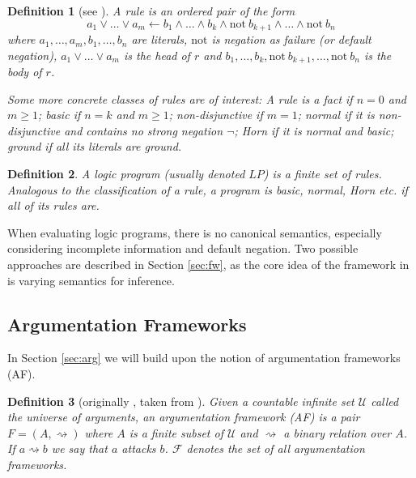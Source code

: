 \documentclass[a4paper]{article}
\newcommand{\fail}{\mathrm{not } \ \xspace}
\newcommand{\from}{\ensuremath{\leftarrow}}
\newcommand{\universe}{\mathcal{U}}
\newcommand{\afs}{\mathcal{F}}
\newcommand{\attacks}{\rightsquigarrow}
\newtheorem{definition}{Definition}
\begin{document}
\begin{definition}[{see \cite[Slide 15]{ewbs}}]
	A \emph{rule} is an ordered pair of the form $$a_1 \vee \ldots \vee a_m \from b_1 \wedge \ldots \wedge b_k \wedge \fail b_{k+1} \wedge \ldots \wedge \fail b_n$$ where $a_1, \ldots, a_m, b_1, \ldots, b_n$ are literals, $\mathrm{not}$ is \emph{negation as failure} (or \emph{default negation}), $a_1 \vee \ldots \vee a_m$ is the \emph{head} of $r$ and $b_1, \ldots, b_k, \fail b_{k+1}, \ldots, \fail b_n$ is the \emph{body} of $r$.
	
	Some more concrete classes of rules are of interest: A rule is a \emph{fact} if $n = 0$ and $m \geq 1$; \emph{basic} if $n = k$ and $m \geq 1$; \emph{non-disjunctive} if $m = 1$; \emph{normal} if it is non-disjunctive and contains no strong negation $\neg$; \emph{Horn} if it is normal and basic; \emph{ground} if all its literals are ground.
\end{definition}

\begin{definition} \label{def:lp}
	A logic program (usually denoted $LP$) is a finite set of rules. Analogous to the classification of a rule, a program is basic, normal, Horn etc. if all of its rules are.
\end{definition}

When evaluating logic programs, there is no canonical semantics, especially considering incomplete information and default negation. Two possible approaches are described in Section \ref{sec:fw}, as the core idea of the framework in \cite{DBLP:journals/tcs/EiterGL97} is varying semantics for inference.

\subsection{Argumentation Frameworks}
\label{sec:prelim:af}

In Section \ref{sec:arg} we will build upon the notion of argumentation frameworks (AF).

\begin{definition}[{originally \cite[Definition~2]{DBLP:journals/ai/Dung95}, taken from \cite[Definition~1]{DBLP:conf/ecai/BoothGKRT14}}]
\label{def:af}
Given a countable infinite set $\universe$ called the \emph{universe of arguments}, an \emph{argumentation framework (AF)} is a pair $F = (A, \attacks)$ where $A$ is a finite subset of $\universe$ and $\attacks$ a binary relation over $A$. If $a \attacks b$ we say that $a$ \emph{attacks} $b$. $\afs$ denotes the set of all argumentation frameworks.
\end{definition}
\end{document}
